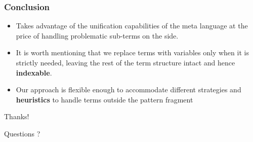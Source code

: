 \documentclass{pres}
\begin{document}
\begin{frame}
  \frametitle{Conclusion}

  \begin{itemize}
    \item Takes advantage of the unification capabilities of the meta language
          at the price of handling problematic sub-terms on the side.
    \item It is worth mentioning that we replace terms with variables only when
          it is strictly needed, leaving the rest of the term structure intact
          and hence \textbf{indexable}.
    \item Our approach is flexible enough to accommodate different strategies
          and \textbf{heuristics} to handle terms outside the pattern fragment
  \end{itemize}

\end{frame}

\begin{frame}

  \centering
    {\Huge\calligra Thanks!}

  \pause
  \begin{center}
    Questions ?
  \end{center}

\end{frame}
\end{document}
